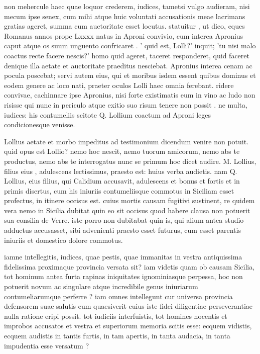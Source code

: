  non mehercule haec quae loquor crederem, iudices, tametsi vulgo audieram, nisi mecum ipse senex, cum mihi atque huic voluntati accusationis meae lacrimans gratias ageret, summa cum auctoritate esset locutus. statuitur , ut dico, eques Romanus annos prope Lxxxx natus in Aproni convivio, cum interea Apronius caput atque os suum unguento confricaret . ' quid est, Lolli?' inquit; 'tu nisi malo coactus recte facere nescis?' homo quid ageret, taceret responderet, quid faceret denique illa aetate et auctoritate praeditus nesciebat. Apronius interea cenam ac pocula poscebat; servi autem eius, qui et moribus isdem essent quibus dominus et eodem genere ac loco nati, praeter oculos Lolli haec omnia ferebant. ridere convivae, cachinnare ipse Apronius, nisi forte existimatis eum in vino ac ludo non risisse qui nunc in periculo atque exitio suo risum tenere non possit . ne multa, iudices: his contumeliis scitote Q. Lollium coactum ad Aproni leges condicionesque venisse.

 Lollius aetate et morbo impeditus ad testimonium dicendum venire non potuit. quid opus est Lollio? nemo hoc nescit, nemo tuorum amicorum, nemo abs te productus, nemo abs te interrogatus nunc se primum hoc dicet audire. M. Lollius, filius eius , adulescens lectissimus, praesto est: huius verba audietis. nam Q. Lollius, eius filius, qui Calidium accusavit, adulescens et bonus et fortis et in primis disertus, cum his iniuriis contumeliisque commotus in Siciliam esset profectus, in itinere occisus est. cuius mortis causam fugitivi sustinent, re quidem vera nemo in Sicilia dubitat quin eo sit occisus quod habere clausa non potuerit sua consilia de Verre. iste porro non dubitabat quin is, qui alium antea studio adductus accusasset, sibi advenienti praesto esset futurus, cum esset parentis iniuriis et domestico dolore commotus.

 iamne intellegitis, iudices, quae pestis, quae immanitas in vestra antiquissima fidelissima proximaque provincia versata sit? iam videtis quam ob causam Sicilia, tot hominum antea furta rapinas iniquitates ignominiasque perpessa, hoc non potuerit novum ac singulare atque incredibile genus iniuriarum contumeliarumque perferre ? iam omnes intellegunt cur universa provincia defensorem suae salutis eum quaesiverit cuius iste fidei diligentiae perseverantiae nulla ratione eripi possit. tot iudiciis interfuistis, tot homines nocentis et improbos accusatos et vestra et superiorum memoria scitis esse: ecquem vidistis, ecquem audistis in tantis furtis, in tam apertis, in tanta audacia, in tanta impudentia esse versatum ?

